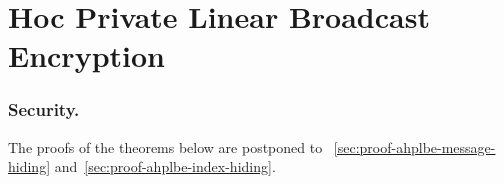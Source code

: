 \section{\Ad Hoc Private Linear Broadcast Encryption}\label{sec:ahplbe}





\subsubsection{Security.}
The proofs of the theorems below are postponed to \Sections~\ref{sec:proof-ahplbe-message-hiding} and~\ref{sec:proof-ahplbe-index-hiding}.




